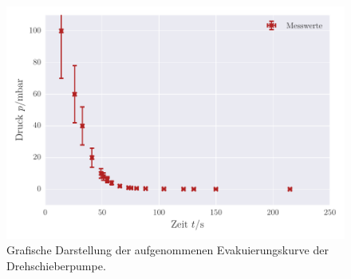 \begin{figure}[!h]
 \centering
 \includegraphics[scale=.9]{../Grafiken/Evakuierungskurve_Drehschieber_exp.pdf}
 \caption{Grafische Darstellung der aufgenommenen Evakuierungskurve der Drehschieberpumpe. \label{fig:evakuierungskurve_drehschieber_exp}}
 \end{figure} 